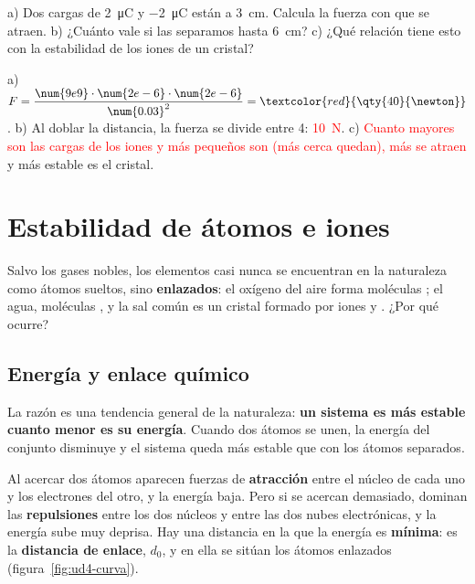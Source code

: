 \begin{exercise}
    a) Dos cargas de \qty{+2}{\micro\coulomb} y \qty{-2}{\micro\coulomb} están a \qty{3}{\cm}. Calcula la fuerza con que se atraen.
    b) ¿Cuánto vale si las separamos hasta \qty{6}{\cm}? c) ¿Qué relación tiene esto con la estabilidad de los iones de un cristal?
    \begin{solu}
        a) \(F = \dfrac{\num{9e9} \cdot \num{2e-6} \cdot \num{2e-6}}{\num{0.03}^2} = \textcolor{red}{\qty{40}{\newton}}\).
        b) Al doblar la distancia, la fuerza se divide entre 4: \textcolor{red}{\qty{10}{\newton}}. c) \textcolor{red}{Cuanto mayores
        son las cargas de los iones y más pequeños son (más cerca quedan), más se atraen} y más estable es el cristal.
    \end{solu}
\end{exercise}

\section{Estabilidad de átomos e iones}\label{sec:ud4-estabilidad}

Salvo los gases nobles, los elementos casi nunca se encuentran en la naturaleza como átomos sueltos, sino \textbf{enlazados}: el
oxígeno del aire forma moléculas ; el agua, moléculas , y la sal común es un cristal formado por iones  y
. ¿Por qué ocurre?

\subsection{Energía y enlace químico}

La razón es una tendencia general de la naturaleza: \textbf{un sistema es más estable cuanto menor es su energía}. Cuando dos
átomos se unen, la energía del conjunto disminuye y el sistema queda más estable que con los átomos separados.

Al acercar dos átomos aparecen fuerzas de \textbf{atracción} entre el núcleo de cada uno y los electrones del otro, y la energía
baja. Pero si se acercan demasiado, dominan las \textbf{repulsiones} entre los dos núcleos y entre las dos nubes electrónicas, y la
energía sube muy deprisa. Hay una distancia en la que la energía es \textbf{mínima}: es la \textbf{distancia de enlace}, \(d_0\),
y en ella se sitúan los átomos enlazados (figura~\ref{fig:ud4-curva}).

